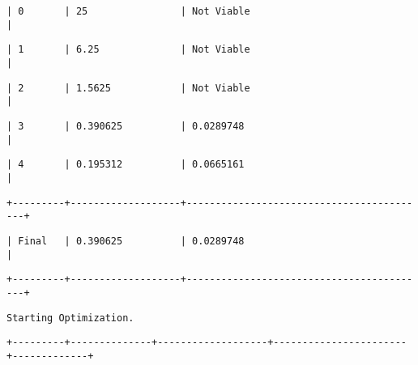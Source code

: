 \documentclass[11pt]{article}
\begin{document}
    
    
    \begin{verbatim}
| 0       | 25                | Not Viable                               |
    \end{verbatim}

    
    
    \begin{verbatim}
| 1       | 6.25              | Not Viable                               |
    \end{verbatim}

    
    
    \begin{verbatim}
| 2       | 1.5625            | Not Viable                               |
    \end{verbatim}

    
    
    \begin{verbatim}
| 3       | 0.390625          | 0.0289748                                |
    \end{verbatim}

    
    
    \begin{verbatim}
| 4       | 0.195312          | 0.0665161                                |
    \end{verbatim}

    
    
    \begin{verbatim}
+---------+-------------------+------------------------------------------+
    \end{verbatim}

    
    
    \begin{verbatim}
| Final   | 0.390625          | 0.0289748                                |
    \end{verbatim}

    
    
    \begin{verbatim}
+---------+-------------------+------------------------------------------+
    \end{verbatim}

    
    
    \begin{verbatim}
Starting Optimization.
    \end{verbatim}

    
    
    \begin{verbatim}
+---------+--------------+-------------------+-----------------------+-------------+
    \end{verbatim}
\end{document}
